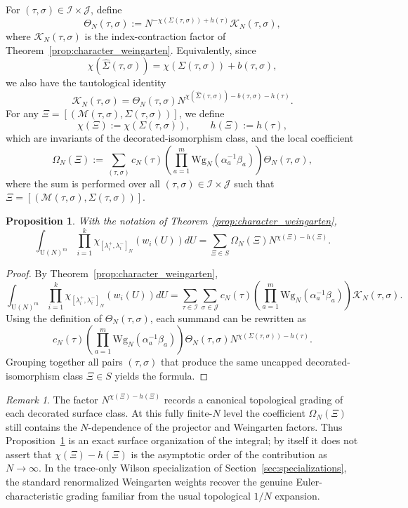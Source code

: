 \documentclass[11pt,a4paper,reqno]{article}
\newtheorem{proposition}[theorem]{Proposition}
\theoremstyle{definition}
\theoremstyle{remark}
\newtheorem{remark}[theorem]{Remark}
\newcommand\U{{\mathrm U}}
\newcommand\M{{\mathcal{M}}}
\begin{document}
For $(\tau,\sigma)\in \mathcal I\times\mathcal J$, define
\[
\Theta_N(\tau,\sigma):=N^{-\chi(\Sigma(\tau,\sigma))+h(\tau)}\mathcal K_N(\tau,\sigma),
\]
where $\mathcal K_N(\tau,\sigma)$ is the index-contraction factor of Theorem~\ref{prop:character_weingarten}. Equivalently, since
\begin{equation}\label{eq:chi_capped_uncapped}
\chi(\widehat\Sigma(\tau,\sigma))=\chi(\Sigma(\tau,\sigma)) + b(\tau,\sigma),
\end{equation}
we also have the tautological identity
\[
\mathcal K_N(\tau,\sigma)=\Theta_N(\tau,\sigma) N^{\chi(\widehat\Sigma(\tau,\sigma))-b(\tau,\sigma)-h(\tau)}.
\]
For any $\Xi=[(\M(\tau,\sigma), \Sigma(\tau,\sigma))]$, we define
\[
\chi(\Xi):=\chi(\Sigma(\tau,\sigma)),\qquad h(\Xi):=h(\tau),
\]
which are invariants of the decorated-isomorphism class, and the local coefficient
\[
\Omega_N(\Xi):=\sum_{(\tau,\sigma)}c_N(\tau) \left(\prod_{a=1}^m \mathrm{Wg}_N(\alpha_a^{-1}\beta_a)\right) \Theta_N(\tau,\sigma),
\]
where the sum is performed over all $(\tau,\sigma)\in \mathcal I\times\mathcal J$ such that $\Xi=[(\M(\tau,\sigma), \Sigma(\tau,\sigma))]$.

\begin{proposition}\label{prop:character_surface}
With the notation of Theorem~\ref{prop:character_weingarten},
\[
\int_{\U(N)^m}\prod_{i=1}^k \chi_{[\lambda_i^+,\lambda_i^-]_N}(w_i(U))dU=\sum_{\Xi\in S}\Omega_N(\Xi)N^{\chi(\Xi)-h(\Xi)}.
\]
\end{proposition}

\begin{proof}
By Theorem~\ref{prop:character_weingarten},
\[
\int_{\U(N)^m}\prod_{i=1}^k \chi_{[\lambda_i^+,\lambda_i^-]_N}(w_i(U))dU=\sum_{\tau\in\mathcal I} \sum_{\sigma\in \mathcal J} c_N(\tau) \left(\prod_{a=1}^m \mathrm{Wg}_N(\alpha_a^{-1}\beta_a)\right) \mathcal K_N(\tau,\sigma).
\]
Using the definition of $\Theta_N(\tau,\sigma)$, each summand can be rewritten as
\[
c_N(\tau)\left(\prod_{a=1}^m \mathrm{Wg}_N(\alpha_a^{-1}\beta_a)\right)\Theta_N(\tau,\sigma)N^{\chi(\Sigma(\tau,\sigma))-h(\tau)}.
\]
Grouping together all pairs $(\tau,\sigma)$ that produce the same uncapped decorated-isomorphism class $\Xi\in S$ yields the formula.
\end{proof}

\begin{remark}\label{rem:topological-grading-not-asymptotic}
The factor $N^{\chi(\Xi)-h(\Xi)}$ records a canonical topological grading of each decorated surface class. At this fully finite-$N$ level the coefficient $\Omega_N(\Xi)$ still contains the $N$-dependence of the projector and Weingarten factors. Thus Proposition~\ref{prop:character_surface} is an exact surface organization of the integral; by itself it does not assert that $\chi(\Xi)-h(\Xi)$ is the asymptotic order of the contribution as $N\to\infty$. In the trace-only Wilson specialization of Section~\ref{sec:specializations}, the standard renormalized Weingarten weights recover the genuine Euler-characteristic grading familiar from the usual topological $1/N$ expansion.
\end{remark}
\end{document}
